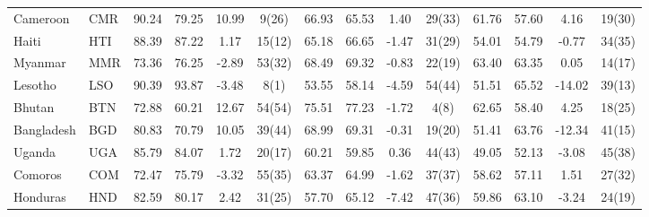 {\begin{longtable}{m{2.3cm}lcccc|cccc|cccc}
Cameroon                          & CMR           & 90.24            & 79.25              & 10.99            & 9(26)            & 66.93    & 65.53      & 1.40     & 29(33)   & 61.76           & 57.60             & 4.16            & 19(30)          \\
Haiti                             & HTI           & 88.39            & 87.22              & 1.17             & 15(12)           & 65.18    & 66.65      & -1.47    & 31(29)   & 54.01           & 54.79             & -0.77           & 34(35)          \\
Myanmar                           & MMR           & 73.36            & 76.25              & -2.89            & 53(32)           & 68.49    & 69.32      & -0.83    & 22(19)   & 63.40           & 63.35             & 0.05            & 14(17)          \\
Lesotho                           & LSO           & 90.39            & 93.87              & -3.48            & 8(1)             & 53.55    & 58.14      & -4.59    & 54(44)   & 51.51           & 65.52             & -14.02          & 39(13)          \\
Bhutan                            & BTN           & 72.88            & 60.21              & 12.67            & 54(54)           & 75.51    & 77.23      & -1.72    & 4(8)     & 62.65           & 58.40             & 4.25            & 18(25)          \\
Bangladesh                        & BGD           & 80.83            & 70.79              & 10.05            & 39(44)           & 68.99    & 69.31      & -0.31    & 19(20)   & 51.41           & 63.76             & -12.34          & 41(15)          \\
Uganda                            & UGA           & 85.79            & 84.07              & 1.72             & 20(17)           & 60.21    & 59.85      & 0.36     & 44(43)   & 49.05           & 52.13             & -3.08           & 45(38)          \\
Comoros                           & COM           & 72.47            & 75.79              & -3.32            & 55(35)           & 63.37    & 64.99      & -1.62    & 37(37)   & 58.62           & 57.11             & 1.51            & 27(32)          \\
Honduras                          & HND           & 82.59            & 80.17              & 2.42             & 31(25)           & 57.70    & 65.12      & -7.42    & 47(36)   & 59.86           & 63.10             & -3.24           & 24(19)          \\

\end{longtable}}
